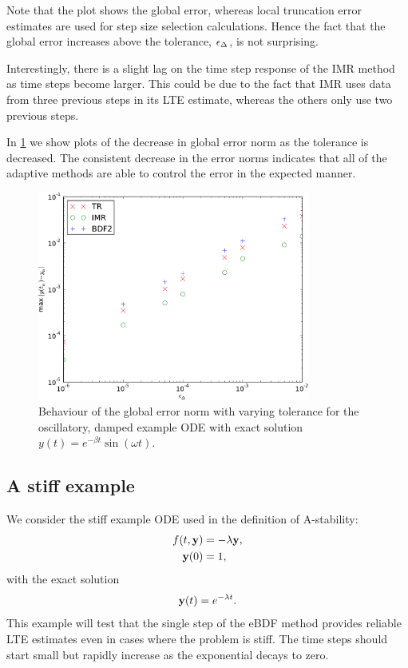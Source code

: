 Note that the plot shows the global error, whereas local truncation error estimates are used for step size selection calculations.
Hence the fact that the global error increases above the tolerance, $\epsilon_{\Delta_{}}$, is not surprising.

Interestingly, there is a slight lag on the time step response of the IMR method as time steps become larger.
This could be due to the fact that IMR uses data from three previous steps in its LTE estimate, whereas the others only use two previous steps.

In \cref{fig:imr-osc-example-scatter} we show plots of the decrease in global error norm as the tolerance is decreased.
The consistent decrease in the error norms indicates that all of the adaptive methods are able to control the error in the expected manner.

\begin{figure}
  \centering \includegraphics[width=0.8\textwidth]{plots/aimr_odes/damped_oscillation-maxoferrornormsvs-tol}
  \caption{Behaviour of the global error norm with varying tolerance for the oscillatory, damped example ODE with exact solution $y(t) = e^{-\beta t} \sin(\omega t)$.}
  \label{fig:imr-osc-example-scatter}
\end{figure}

\subsection{A stiff example}
\label{sec:imr-stiff-example}

We consider the stiff example ODE used in the definition of A-stability:
\begin{equation}
  \label{eqn:imr-test-stiff}
  \begin{aligned}
    f(t, \boldsymbol{\mathrm{y}}) &= -\lambda \boldsymbol{\mathrm{y}}, \\
    \boldsymbol{\mathrm{y}}(0) &= 1,
  \end{aligned}
\end{equation}
with the exact solution
\begin{equation}
  \label{eqn:imr-test-stiff-exact}
  \boldsymbol{\mathrm{y}}(t) = e^{-\lambda t}.
\end{equation}
This example will test that the single step of the eBDF method provides reliable LTE estimates even in cases where the problem is stiff.
The time steps should start small but rapidly increase as the exponential decays to zero.

